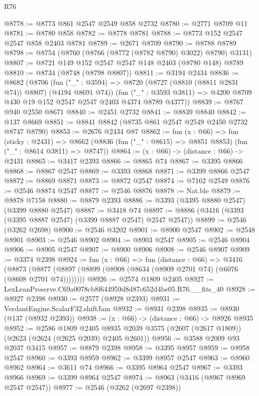 \begin{lexlean}{R76}
\begin{coremodule}
@8778 := @8773 @861 @2547 @2549 @858 @2732
@8780 := @2771 @8709 @11
@8781 := @8780 @858
@8782 := @8778 @8781
@8788 := @8773 @152 @2547 @2547 @858 @2403 @8781
@8789 := @2671 @8709
@8790 := @8788 @8789
@8798 := @8754 (@8760 (@8766 (@8772 (@8782 @8790) @3022) @8790) @3131)
@8807 := @8721 @149 @152 @2547 @2547 @148 @2403 (@8780 @148) @8789
@8810 := @8734 (@8748 (@8798 @8807))
@8811 := @3194 @2434
@8836 := @8682
    (@8706
      (fun ("_" : @3594) => @8720 (@8727 (@8810 (@8811 @2831 @74)) @8807) (@4194 @8691 @74))
      (fun ("_" : @3593 @3811) => @4200 @8709 @430 @19 @152 @2547 @2547 @2403 @4374 @8789 @4377))
@8839 := @8767 @940 @2550 @8671
@8840 := @2451 @2732
@8841 := @8839 @8840
@8842 := @137 @8669
@8851 := @8841 @8842 (@8735 @861 @2547 @2549 @2450 @2732 @8747 @8790)
@8853 := @2676 @2434 @87
@8862 := fun (x : @66) =>
  fun (sticky : @2431) =>
  @8662 (@8836 (fun ("_" : @8615) => @8851 @8853) (fun ("_" : @8614 @3811) => @8747))
@8864 := (x : @66) -> (distance : @66) -> @2431
@8865 := @3417 @2393
@8866 := @8865 @74
@8867 := @3395 @8866
@8868 := @8867 @2547
@8869 := @3393 @8868
@8871 := @3399 @8866 @2547
@8872 := @8869 @8871
@8873 := @8872 @2547
@8874 := @7162 @2549
@8876 := @2546 @8874 @2547
@8877 := @2546 @8876
@8878 := Nat.ble
@8879 := @8878 @7158
@8880 := @8879 @2393
@8886 := @3393 (@3395 @8880 @2547) (@3399 @8880 @2547)
@8887 := @3418 @74
@8897 := @8886 (@3416 (@3393 (@3395 @8887 @2547) (@3399 @8887 @2547) @2547 @2547))
@8899 := @2546 (@3262 @2698)
@8900 := @2546 @3202
@8901 := @8900 @2547
@8902 := @2548 @8901
@8903 := @2546 @8902
@8904 := @8903 @2547
@8905 := @2546 @8904
@8906 := @8905 @2547
@8907 := @8900 @8906
@8908 := @2546 @8907
@8909 := @3374 @2398
@8924 := fun (x : @66) =>
  fun (distance : @66) =>
  @3416 (@8873 (@8877 (@8897 (@8899 (@8908 (@8634 (@8909 @2701 @74) (@6076 (@8608 @2701 @74))))))))
@8926 := @2574 @1809 @2405
@8927 := LexLeanPreserve.C69a0078cb8f644959d8d87c652d4be05.R76.__fits_40
@8928 := @8927 @2398
@8930 := @2577 (@8928 @2393)
@8931 := VerdantEngine.ScalarF32.shiftJam
@8932 := @8931 @2398
@8935 := @8930 (@137 (@8932 @2393))
@8938 := (x : @66) -> (distance : @66) -> @8926 @8935
@8952 := @2586
    @1809
    @2405
    @8935
    @2039
    @3575
    (@2607 (@2617 @1809))
    (@2623 (@2624 (@2625 @2039) @2405 @2601))
@8956 := @3588 @2009 @93 @2037 @3415
@8957 := @8879 @2398
@8958 := @3395 @8957
@8959 := @8958 @2547
@8960 := @3393 @8959
@8962 := @3399 @8957 @2547
@8963 := @8960 @8962
@8964 := @3611 @74
@8966 := @3395 @8964 @2547
@8967 := @3393 @8966
@8969 := @3399 @8964 @2547
@8974 := @8963 (@3416 (@8967 @8969 @2547 @2547))
@8977 := @2546 (@3262 (@2697 @2398))

\end{coremodule}
\end{lexlean}
